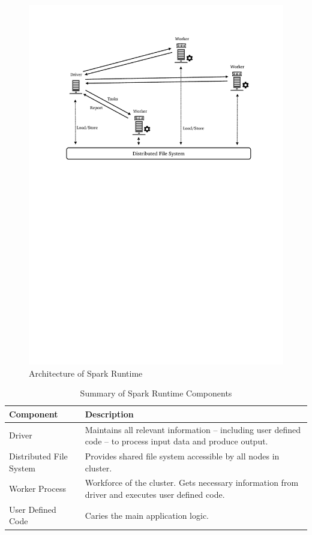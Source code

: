 \begin{figure}[!htbp]
    \centering
    \includegraphics[clip,trim=3cm 16.8cm 2.5cm 2.5cm]{spark-high.pdf}
    \caption[Architecture of Spark Runtime]{Architecture of Spark Runtime\footnotemark}
    \label{fig:spark-runtime}
\end{figure}
\begin{table}[!htbp]
    \begin{tabularx}{\textwidth}{lX}
        \toprule
        \textbf{Component} & \textbf{Description}\\
        \midrule
        Driver & Maintains all relevant information -- including user defined code -- to process input data and produce output.\\
        Distributed File System & Provides shared file system accessible by all nodes in cluster.\\
        Worker Process & Workforce of the cluster. Gets necessary information from driver and executes user defined code.\\
        User Defined Code & Caries the main application logic.\\
        \bottomrule
    \end{tabularx}
    \centering
    \caption{Summary of Spark Runtime Components}
    \label{tab:spark-runtime}
\end{table}

